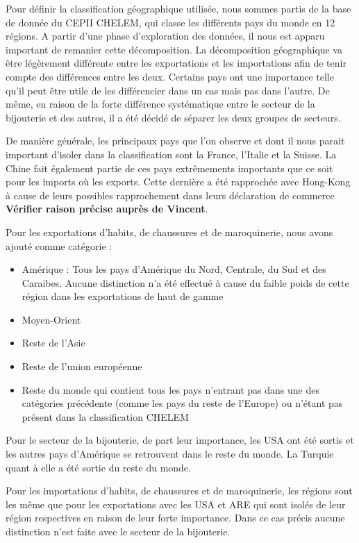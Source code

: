 \documentclass[french,10pt,a4paper]{article}
\begin{document}
Pour définir la classification géographique utilisée, nous sommes partis de la base de donnée du CEPII CHELEM, qui classe les différents pays du monde en 12 régions. A partir d'une phase d'exploration des données, il nous est apparu important de remanier cette décomposition. La décomposition géographique va être légèrement différente entre les exportations et les importations afin de tenir compte des différences entre les deux. Certains pays ont une importance telle qu'il peut être utile de les différencier dans un cas mais pas dans l'autre. De même, en raison de la forte différence systématique entre le secteur de la bijouterie et des autres, il a été décidé de séparer les deux groupes de secteurs.

De manière générale, les principaux pays que l'on observe et dont il nous parait important d'isoler dans la classification sont la France, l'Italie et la Suisse. La Chine fait également partie de ces pays extrêmements importants que ce soit pour les imports où les exports. Cette dernière a été rapprochée avec Hong-Kong à cause de leurs possibles rapprochement dans leurs déclaration de commerce \textbf{Vérifier raison précise auprès de Vincent}.

Pour les exportations d'habits, de chaussures et de maroquinerie, nous avons ajouté comme catégorie :

\begin{itemize}
  \item Amérique : Tous les pays d'Amérique du Nord, Centrale, du Sud et des Caraibes. Aucune distinction n'a été effectué à cause du faible poids de cette région dans les exportations de haut de gamme
  \item Moyen-Orient
  \item Reste de l'Asie
  \item Reste de l'union européenne
  \item Reste du monde qui contient tous les pays n'entrant pas dans une des catégories précédente (comme les pays du reste de l'Europe) ou n'étant pas présent dans la classification CHELEM
\end{itemize}

Pour le secteur de la bijouterie, de part leur importance, les USA ont été sortis et les autres pays d'Amérique se retrouvent dans le reste du monde. La Turquie quant à elle a été sortie du reste du monde.

Pour les importations d'habits, de chaussures et de maroquinerie, les régions sont les même que pour les exportations avec les USA et ARE qui sont isolés de leur région respectives en raison de leur forte importance. Dans ce cas précis aucune distinction n'est faite avec le secteur de la bijouterie.
\end{document}
